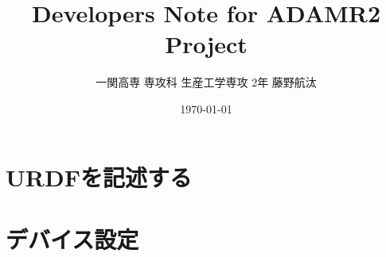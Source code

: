 \documentclass[uplatex, a4paper]{jsreport}
\title{\Huge Developers Note for ADAMR2 Project}
\author{一関高専 専攻科 生産工学専攻 2年 藤野航汰}
\date{\today}
\begin{document}
\maketitle  %

\tableofcontents  %
\newpage

\chapter{URDFを記述する}







\chapter{デバイス設定}




\end{document}

